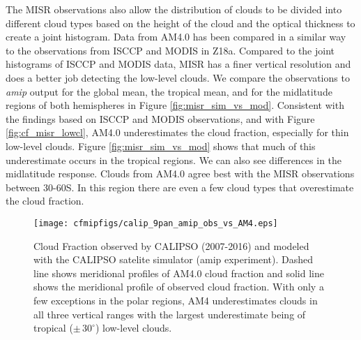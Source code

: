 \documentclass[draft]{agujournal2019}
\begin{document}
The MISR observations also allow the distribution of clouds to be divided into different cloud types based on the height of the cloud and
the optical thickness to create a joint histogram.  
Data from AM4.0 has been compared in a similar way to the observations from ISCCP and MODIS in Z18a.  
Compared to the joint histograms of ISCCP and MODIS data, MISR has a finer
vertical resolution and does a better job detecting the low-level clouds.  We compare the observations to 
\textit{amip} output for the global mean, the tropical mean, and for the midlatitude regions of both hemispheres 
in Figure \ref{fig:misr_sim_vs_mod}.
Consistent with the findings based on ISCCP and MODIS observations, and with Figure \ref{fig:cf_misr_lowcl},
AM4.0 underestimates the cloud fraction, especially for thin low-level clouds.  Figure \ref{fig:misr_sim_vs_mod}
shows that much of this underestimate occurs in the tropical regions.  We can also see differences in the
midlatitude response.  Clouds from AM4.0 agree best with the MISR observations between 30-60S.  In this 
region there are even a few cloud types that overestimate the cloud fraction.  

\begin{figure}
  \centering
  \texttt{[image: cfmipfigs/calip\_9pan\_amip\_obs\_vs\_AM4.eps]}
  \caption{Cloud Fraction observed by CALIPSO (2007-2016) and modeled with the CALIPSO satelite simulator 
  (amip experiment).
  Dashed line shows meridional profiles of AM4.0 cloud fraction and solid line shows
  the meridional profile of observed cloud fraction.  With only a few exceptions in the polar regions, AM4 underestimates
  clouds in all three vertical ranges with the largest underestimate being of tropical ($\pm \, 30^\circ$) low-level clouds.}
  \label{fig:calipso_9pan}
\end{figure}
\end{document}
